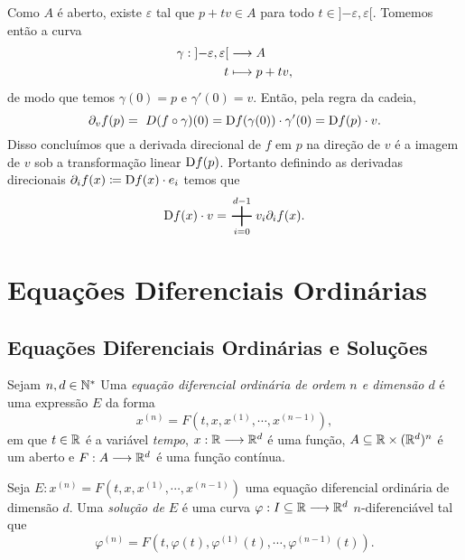 Como $A$ é aberto, existe $\varepsilon$ tal que $p+tv \in A$ para todo $t \in ]{-\varepsilon},\varepsilon[$. Tomemos então a curva
	\begin{align*}
	{\gamma}: {]{-\varepsilon},\varepsilon[} &\longrightarrow {A} \\{t} &\longmapsto {p+tv},
	\end{align*}
de modo que temos $\gamma(0)=p$ e $\gamma'(0) = v$. Então, pela regra da cadeia,
	\begin{equation*}
	 \partial_v f(p) = \ D (f \circ \gamma)(0) = \mathrm{D} f(\gamma(0)) \cdot \gamma'(0) = \mathrm{D} f(p) \cdot v.
	\end{equation*}
Disso concluímos que a derivada direcional de $f$ em $p$ na direção de $v$ é a imagem de $v$ sob a transformação linear $\mathrm{D} f(p)$. Portanto definindo as derivadas direcionais $\partial_i f(x) \coloneqq \mathrm{D} f(x) \cdot e_i$ temos que
	\begin{equation*}
	\D f(x) \cdot v = \bigplus_{i=0}^{d-1} v_i \partial_i f(x).
	\end{equation*}















\chapter{Equações Diferenciais Ordinárias}

\section{Equações Diferenciais Ordinárias e Soluções}

\begin{defi}
	Sejam $n,d \in \mathbb{N}^*$ Uma \emph{equação diferencial ordinária de ordem $n$ e dimensão $d$} é uma expressão $E$ da forma
	\begin{equation*}
	x^{(n)} = F(t, x, x^{(1)}, \cdots,x^{(n-1)}),
	\end{equation*}
em que $t \in \mathbb{R}$ é a variável \emph{tempo}, $x : \mathbb{R} \longrightarrow \mathbb{R}^d$ é uma função, $A \subseteq \mathbb{R} \times (\mathbb{R}^d)^n$ é um aberto e $F: A \longrightarrow \mathbb{R}^d$ é uma função contínua.
\end{defi}

\begin{defi}
	Seja $E: x^{(n)} = F(t, x, x^{(1)}, \cdots,x^{(n-1)})$ uma equação diferencial ordinária de dimensão $d$. Uma \emph{solução de $E$} é uma curva $\varphi: I \subseteq \mathbb{R} \longrightarrow \mathbb{R}^d$ $n$-diferenciável tal que
	\begin{equation*}
	\varphi^{(n)} = F(t, \varphi(t), \varphi^{(1)}(t), \cdots,\varphi^{(n-1)}(t)).
	\end{equation*}
\end{defi}


